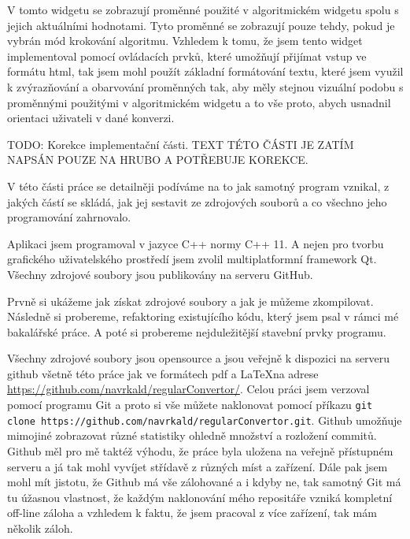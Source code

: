 
V tomto widgetu se zobrazují proměnné použité v algoritmickém widgetu spolu s jejich  aktuálními hodnotami. Tyto proměnné se zobrazují pouze tehdy, pokud je vybrán mód krokování algoritmu. Vzhledem k tomu, že jsem tento widget implementoval pomocí ovládacích prvků, které umožňují přijímat vstup ve formátu html, tak jsem mohl použít základní formátování textu, které jsem využil k zvýrazňování a obarvování proměnných tak, aby měly stejnou vizuální podobu s proměnnými použitými v algoritmickém widgetu a to vše proto, abych usnadnil orientaci uživateli v dané konverzi.


TODO: Korekce implementační části. TEXT TÉTO ČÁSTI JE ZATÍM NAPSÁN POUZE NA HRUBO A POTŘEBUJE KOREKCE.

V této části práce se detailněji podíváme na to jak samotný program vznikal, z jakých částí se skládá, jak jej sestavit ze zdrojových souborů a co všechno jeho programování zahrnovalo.

Aplikaci jsem programoval v jazyce C++ normy C++ 11. A nejen pro tvorbu grafického uživatelského prostředí jsem zvolil multiplatformní framework Qt. Všechny zdrojové soubory jsou publikovány na serveru GitHub.

Prvně si ukážeme jak získat zdrojové soubory a jak je můžeme zkompilovat. Následně si probereme, refaktoring existujícího kódu, který jsem psal v rámci mé bakalářské práce. A poté si probereme nejduležitější stavební prvky programu.


Všechny zdrojové soubory jsou opensource a jsou veřejně k dispozici na serveru github všetně této práce jak ve formátech pdf a \LaTeX na adrese \url{https://github.com/navrkald/regularConvertor/}. Celou práci jsem verzoval pomocí programu Git a proto si vše můžete naklonovat pomocí příkazu \texttt{git clone https://github.com/navrkald/regularConvertor.git}. Github umožňuje mimojiné zobrazovat různé statistiky ohledně množství a rozložení commitů. Github měl pro mě taktéž výhodu, že práce byla uložena na veřejně přístupném serveru a já tak mohl vyvíjet střídavě z různých míst a zařízení. Dále pak jsem mohl mít jistotu, že Github má vše zálohované a i kdyby ne, tak samotný Git má tu úžasnou vlastnost, že každým naklonování mého repositáře vzniká kompletní off-line záloha a vzhledem k faktu, že jsem pracoval z více zařízení, tak mám několik záloh.

